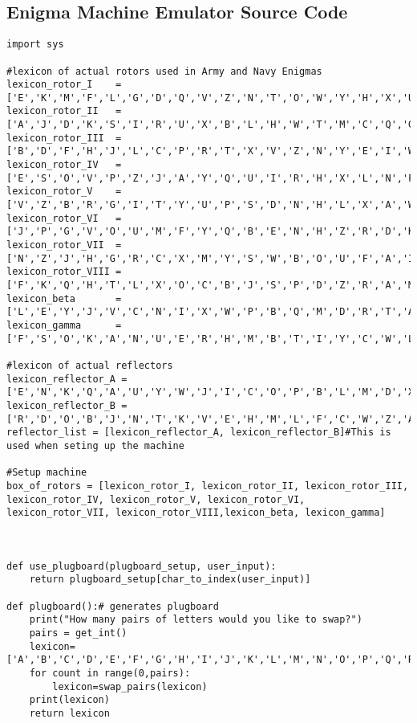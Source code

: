 \documentclass[12pt,letterpaper]{article} %
\begin{document}
\subsection{Enigma Machine Emulator Source Code}
\begin{lstlisting}
import sys

#lexicon of actual rotors used in Army and Navy Enigmas 
lexicon_rotor_I    = ['E','K','M','F','L','G','D','Q','V','Z','N','T','O','W','Y','H','X','U','S','P','A','I','B','R','C','J'] 
lexicon_rotor_II   = ['A','J','D','K','S','I','R','U','X','B','L','H','W','T','M','C','Q','G','Z','N','P','Y','F','V','O','E']
lexicon_rotor_III  = ['B','D','F','H','J','L','C','P','R','T','X','V','Z','N','Y','E','I','W','G','A','K','M','U','S','Q','O']
lexicon_rotor_IV   = ['E','S','O','V','P','Z','J','A','Y','Q','U','I','R','H','X','L','N','F','T','G','K','D','C','M','W','B']
lexicon_rotor_V    = ['V','Z','B','R','G','I','T','Y','U','P','S','D','N','H','L','X','A','W','M','J','Q','O','F','E','C','K']
lexicon_rotor_VI   = ['J','P','G','V','O','U','M','F','Y','Q','B','E','N','H','Z','R','D','K','A','S','X','L','I','C','T','W']
lexicon_rotor_VII  = ['N','Z','J','H','G','R','C','X','M','Y','S','W','B','O','U','F','A','I','V','L','P','E','K','Q','D','T']
lexicon_rotor_VIII = ['F','K','Q','H','T','L','X','O','C','B','J','S','P','D','Z','R','A','M','E','W','N','I','U','Y','G','V']
lexicon_beta       = ['L','E','Y','J','V','C','N','I','X','W','P','B','Q','M','D','R','T','A','K','Z','G','F','U','H','O','S']
lexicon_gamma      = ['F','S','O','K','A','N','U','E','R','H','M','B','T','I','Y','C','W','L','Q','P','Z','X','V','G','J','D']

#lexicon of actual reflectors
lexicon_reflector_A = ['E','N','K','Q','A','U','Y','W','J','I','C','O','P','B','L','M','D','X','Z','V','F','T','H','R','G','S']
lexicon_reflector_B = ['R','D','O','B','J','N','T','K','V','E','H','M','L','F','C','W','Z','A','X','G','Y','I','P','S','U','Q']
reflector_list = [lexicon_reflector_A, lexicon_reflector_B]#This is used when seting up the machine

#Setup machine
box_of_rotors = [lexicon_rotor_I, lexicon_rotor_II, lexicon_rotor_III, lexicon_rotor_IV, lexicon_rotor_V, lexicon_rotor_VI, lexicon_rotor_VII, lexicon_rotor_VIII,lexicon_beta, lexicon_gamma]


    
def use_plugboard(plugboard_setup, user_input):
    return plugboard_setup[char_to_index(user_input)]

def plugboard():# generates plugboard
    print("How many pairs of letters would you like to swap?")
    pairs = get_int()
    lexicon=['A','B','C','D','E','F','G','H','I','J','K','L','M','N','O','P','Q','R','S','T','U','V','W','X','Y','Z']
    for count in range(0,pairs):
        lexicon=swap_pairs(lexicon)
    print(lexicon)
    return lexicon 


\end{lstlisting}
\end{document}
